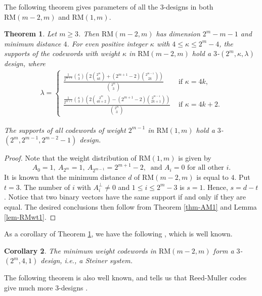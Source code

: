 \documentclass[1p,final]{elsarticle}
\newtheorem{theorem}{Theorem}
\newtheorem{corollary}[theorem]{Corollary}
\newcommand{\RM}{{\mathrm{RM}}}
\begin{document}
The following theorem gives parameters of all the $3$-designs in both $\RM(m-2, m)$ and $\RM(1, m)$. 


\begin{theorem}\label{thm-brmdesign1}
Let $m \geq 3$. Then $\RM(m-2, m)$ has dimension $2^m -m-1$ and minimum distance $4$.
For even positive integer $\kappa$ with $4 \leq \kappa \leq 2^m-4$, the supports of
the codewords with weight $\kappa$ in $\RM(m-2, m)$ hold a $3$-$(2^m, \kappa, \lambda)$
design, where
\begin{eqnarray*}
\lambda=\left\{
\begin{array}{ll}
\frac{\frac{1}{2^{m+1}}\binom{\kappa}{3}\left(2\binom{2^m}{4k} + (2^{m+1}-2) \binom{2^{m-1}}{2k} \right)}{\binom{2^m}{3}}  & \mbox{ if } \kappa = 4k, \\
\frac{\frac{1}{2^{m+1}}\binom{\kappa}{3}\left(2\binom{2^m}{4k+2} - (2^{m+1}-2) \binom{2^{m-1}}{2k+1} \right)}{\binom{2^m}{3}}  & \mbox{ if } \kappa = 4k+2.
\end{array}
\right.
\end{eqnarray*}

The supports of all codewords of weight $2^{m-1}$ in $\RM(1, m)$ hold a $3$-$(2^m, 2^{m-1}, 2^{m-2}-1)$
design. 


\end{theorem}

\begin{proof}
Note that the weight distribution of $\RM(1,m)$ is given by
$$
A_0=1, \ A_{2^m}=1, \ A_{2^{m-1}}=2^{m+1}-2, \ \mbox{ and } A_i =0 \mbox{ for all other $i$.}
$$
It is known that the minimum distance $d$ of $\RM(m-2, m)$ is equal to $4$. Put $t=3$. The number of
$i$ with $A_i^\perp \neq 0$ and $1 \leq i \leq 2^m -3$ is $s=1$. Hence, $s=d-t$. Notice that two 
binary vectors have the same support if and only if they are equal. 
The desired conclusions then follow from Theorem \ref{thm-AM1} and Lemma \ref{lem-RMwt1}.
\end{proof}


As a corollary of Theorem \ref{thm-brmdesign1}, we have the following \cite[p. 63]{MS77}, which is well 
known.

\begin{corollary}
The minimum weight codewords in $\RM(m-2, m)$ form a $3$-$(2^m, 4, 1)$ design, i.e., a Steiner system.
\end{corollary}

The following theorem is also well known, and tells us that Reed-Muller codes give much more $3$-designs 
\cite{Tonchevhb}. 
\end{document}
